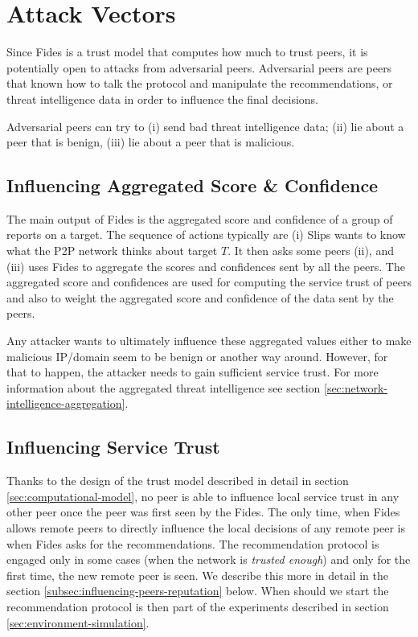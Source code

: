 \section{Attack Vectors}
\label{sec:attack-vectors}
Since Fides is a trust model that computes how much to trust peers, it is potentially open to attacks from adversarial peers. Adversarial peers are peers that known how to talk the protocol and manipulate the recommendations, or threat intelligence data in order to influence the final decisions.

Adversarial peers can try to (i) send bad threat intelligence data; (ii) lie about a peer that is benign, (iii) lie about a peer that is malicious.

\subsection{Influencing Aggregated Score \& Confidence}
\label{subsec:influencing-aggregated-score-confidence}
The main output of Fides is the aggregated score and confidence of a group of reports on a target. The sequence of actions typically are (i) Slips wants to know what the P2P network thinks about target $T$. It then asks some peers (ii), and (iii) uses Fides to aggregate the scores and confidences sent by all the peers. The aggregated score and confidences are used for computing the service trust of peers and also to weight the aggregated score and confidence of the data sent by the peers.

Any attacker wants to ultimately influence these aggregated values either to make malicious IP/domain seem to be benign or another way around.
However, for that to happen, the attacker needs to gain sufficient service trust.
For more information about the aggregated threat intelligence see section \ref{sec:network-intelligence-aggregation}.

\subsection{Influencing Service Trust}
\label{subsec:influencing-service-trust}
Thanks to the design of the trust model described in detail in section \ref{sec:computational-model}, no peer is able to influence local service trust in any other peer once the peer was first seen by the Fides.
The only time, when Fides allows remote peers to directly influence the local decisions of any remote peer is when Fides asks for the recommendations. 
The recommendation protocol is engaged only in some cases (when the network is \textit{trusted enough}) and only for the first time, the new remote peer is seen. We describe this more in detail in the section \ref{subsec:influencing-peers-reputation} below.
When should we start the recommendation protocol is then part of the experiments described in section \ref{sec:environment-simulation}.

